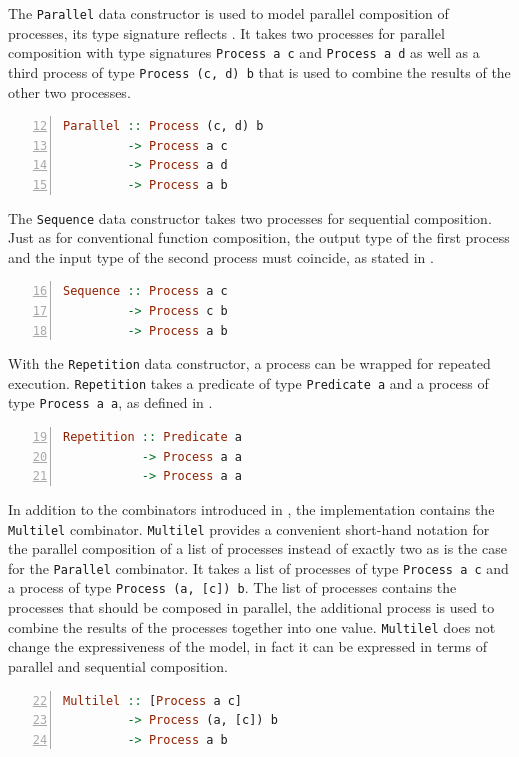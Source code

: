 The \texttt{Parallel} data constructor is used to model parallel composition of processes, its type signature reflects . It takes two processes for parallel composition with type signatures \texttt{Process a c} and \texttt{Process a d} as well as a third process of type \texttt{Process (c, d) b} that is used to combine the results of the other two processes.
\begin{lstlisting}[language=Haskell,caption=Signature of the \texttt{Parallel} data constructor.,numbers=left,frame=bt,firstnumber=12]
Parallel :: Process (c, d) b
         -> Process a c
         -> Process a d
         -> Process a b
\end{lstlisting}

The \texttt{Sequence} data constructor takes two processes for sequential composition. Just as for conventional function composition, the output type of the first process and the input type of the second process must coincide, as stated in .
\begin{lstlisting}[language=Haskell,caption=Signature of the \texttt{Seqeuence} data constructor.,numbers=left,frame=bt,firstnumber=16]
Sequence :: Process a c
         -> Process c b
         -> Process a b
\end{lstlisting}

With the \texttt{Repetition} data constructor, a process can be wrapped for repeated execution. \texttt{Repetition} takes a predicate of type \texttt{Predicate a} and a process of type \texttt{Process a a}, as defined in .
\begin{lstlisting}[language=Haskell,caption=Signature of the \texttt{Repetition} data constructor.,numbers=left,frame=bt,firstnumber=19]
Repetition :: Predicate a
           -> Process a a
           -> Process a a
\end{lstlisting}

In addition to the combinators introduced in , the implementation contains the \texttt{Multilel} combinator. \texttt{Multilel} provides a convenient short-hand notation for the parallel composition of a list of processes instead of exactly two as is the case for the \texttt{Parallel} combinator. It takes a list of processes of type \texttt{Process a c} and a process of type \texttt{Process (a, [c]) b}. The list of processes contains the processes that should be composed in parallel, the additional process is used to combine the results of the processes together into one value. \texttt{Multilel} does not change the expressiveness of the model, in fact it can be expressed in terms of parallel and sequential composition.
\begin{lstlisting}[language=Haskell,caption=Signature of the \texttt{Multilel} data constructor.,numbers=left,frame=bt,firstnumber=22]
Multilel :: [Process a c]
         -> Process (a, [c]) b
         -> Process a b
\end{lstlisting}


